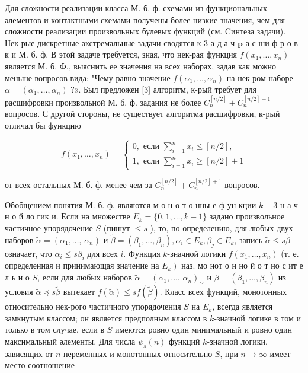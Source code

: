 \documentclass[10pt]{article}
\begin{document}
Для сложности реализации класса М. б. ф. схемами из функциональных әлементов и контактными схемами получены более низкие значения, чем для сложности реализации произвольных булевых функций (см. Cинтеза задачи). Нек-рые дискретные әкстремальные задачи сводятся к 3 а д а ч $\mathbf{p}$ а с ши ф р о в к и М. б. ф. В этой задаче требуется, зная, что нек-рая функция $f\left(x_{1}, \ldots, x_{n}\right)$ является М. б. Ф., выяснить ее значения на всех наборах, задав как можно меньше вопросов вида: "Чему равно значение $f\left(\alpha_{1}, \ldots, \alpha_{n}\right)$ на нек-ром наборе $\tilde{\alpha}=\left(\alpha_{1}, \ldots, \alpha_{n}\right)$ ?». Был предложен [3] алгоритм, к-рый требует для расшифровки произвольной М. б. ф. задания не более $C_{n}^{[n / 2]}+C_{n}^{[n / 2]+1}$ вопросов. С другой стороны, не существует алгоритма расшифровки, к-рый отличал бы функцию



\[

f\left(x_{1}, \ldots, x_{n}\right)=\left\{\begin{array}{l}

0, \text { если } \sum_{i=1}^{n} x_{i} \leqslant[n / 2], \\

1, \text { если } \sum_{i=1}^{n} x_{i} \geqslant[n / 2]+1

\end{array}\right.

\]



от всех остальных М. б. ф. менее чем за $C_{n}^{[n / 2]}+C_{n}^{[n / 2]+1}$ вопросов.



Обобщением понятия М. б. ф. являются м о н о т о нны е ф ун кции $k-3$ н а ч н о й ло гик и. Если на множестве $E_{k}=\{0,1, \ldots, k-1\}$ задано произвольное частичное упорядочение $S$ (пишут $\leqslant s$ ), то, по определению, для любых двух наборов $\tilde{\alpha}=\left(\alpha_{1}, \ldots\right.$, $\left.\alpha_{n}\right)$ и $\tilde{\beta}=\left(\beta_{1}, \ldots, \beta_{n}\right), \alpha_{i} \in E_{k}, \beta_{j} \in E_{k}$, запись $\tilde{\alpha} \leq s \tilde{\beta}$ означает, что $\alpha_{i} \leqslant s \beta_{i}$ для всех $i$. Функция $k$-значной логики $f\left(x_{1}, \ldots, x_{n}\right)$ (т. е. определенная и принимающая значение на $\left.E_{k}\right)$ наз. мо нот $о$ н но й $о$ т но с ит е л ь н о $S$, если для любых наборов $\tilde{\alpha}=\left(\alpha_{1}, \ldots\right.$, $\left.\alpha_{n}\right)_{\sim}$ и $\tilde{\beta}=\left(\beta_{1}, \ldots, \beta_{n}\right)$ из условия $\tilde{\alpha} \preceq s \tilde{\beta}$ вытекает $f(\tilde{\alpha}) \leqslant s f(\tilde{\beta})$. Класс всех функций, монотонных относительно нек-рого частичного упорядочения $S$ на $E_{k}$, всегда является замкнутым классом; он является предполным классом в $k$-значной логике в том и только в том случае, если в $S$ имеются ровно один минимальный и ровно один максимальный әлементы. Для числа $\psi_{s}(n)$ функций $k$-значной логики, зависящих от $n$ переменных и монотонных относительно $S$, при $n \rightarrow \infty$ имеет место соотношение
\end{document}
